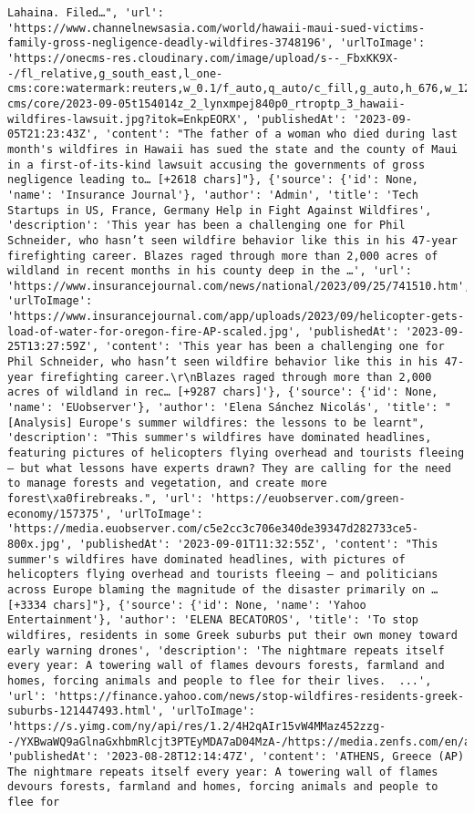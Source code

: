 \documentclass[
  letterpaper,
  DIV=11,
  numbers=noendperiod]{scrartcl}
\begin{document}
\begin{verbatim}
Lahaina. Filed…", 'url': 'https://www.channelnewsasia.com/world/hawaii-maui-sued-victims-family-gross-negligence-deadly-wildfires-3748196', 'urlToImage': 'https://onecms-res.cloudinary.com/image/upload/s--_FbxKK9X--/fl_relative,g_south_east,l_one-cms:core:watermark:reuters,w_0.1/f_auto,q_auto/c_fill,g_auto,h_676,w_1200/v1/one-cms/core/2023-09-05t154014z_2_lynxmpej840p0_rtroptp_3_hawaii-wildfires-lawsuit.jpg?itok=EnkpEORX', 'publishedAt': '2023-09-05T21:23:43Z', 'content': "The father of a woman who died during last month's wildfires in Hawaii has sued the state and the county of Maui in a first-of-its-kind lawsuit accusing the governments of gross negligence leading to… [+2618 chars]"}, {'source': {'id': None, 'name': 'Insurance Journal'}, 'author': 'Admin', 'title': 'Tech Startups in US, France, Germany Help in Fight Against Wildfires', 'description': 'This year has been a challenging one for Phil Schneider, who hasn’t seen wildfire behavior like this in his 47-year firefighting career. Blazes raged through more than 2,000 acres of wildland in recent months in his county deep in the …', 'url': 'https://www.insurancejournal.com/news/national/2023/09/25/741510.htm', 'urlToImage': 'https://www.insurancejournal.com/app/uploads/2023/09/helicopter-gets-load-of-water-for-oregon-fire-AP-scaled.jpg', 'publishedAt': '2023-09-25T13:27:59Z', 'content': 'This year has been a challenging one for Phil Schneider, who hasn’t seen wildfire behavior like this in his 47-year firefighting career.\r\nBlazes raged through more than 2,000 acres of wildland in rec… [+9287 chars]'}, {'source': {'id': None, 'name': 'EUobserver'}, 'author': 'Elena Sánchez Nicolás', 'title': "[Analysis] Europe's summer wildfires: the lessons to be learnt", 'description': "This summer's wildfires have dominated headlines, featuring pictures of helicopters flying overhead and tourists fleeing — but what lessons have experts drawn? They are calling for the need to manage forests and vegetation, and create more forest\xa0firebreaks.", 'url': 'https://euobserver.com/green-economy/157375', 'urlToImage': 'https://media.euobserver.com/c5e2cc3c706e340de39347d282733ce5-800x.jpg', 'publishedAt': '2023-09-01T11:32:55Z', 'content': "This summer's wildfires have dominated headlines, with pictures of helicopters flying overhead and tourists fleeing — and politicians across Europe blaming the magnitude of the disaster primarily on … [+3334 chars]"}, {'source': {'id': None, 'name': 'Yahoo Entertainment'}, 'author': 'ELENA BECATOROS', 'title': 'To stop wildfires, residents in some Greek suburbs put their own money toward early warning drones', 'description': 'The nightmare repeats itself every year: A towering wall of flames devours forests, farmland and homes, forcing animals and people to flee for their lives.  ...', 'url': 'https://finance.yahoo.com/news/stop-wildfires-residents-greek-suburbs-121447493.html', 'urlToImage': 'https://s.yimg.com/ny/api/res/1.2/4H2qAIr15vW4MMaz452zzg--/YXBwaWQ9aGlnaGxhbmRlcjt3PTEyMDA7aD04MzA-/https://media.zenfs.com/en/ap_finance_articles_694/6373e71119ef08bbb0104ee9f492b23e', 'publishedAt': '2023-08-28T12:14:47Z', 'content': 'ATHENS, Greece (AP) The nightmare repeats itself every year: A towering wall of flames devours forests, farmland and homes, forcing animals and people to flee for 
\end{verbatim}
\end{document}
